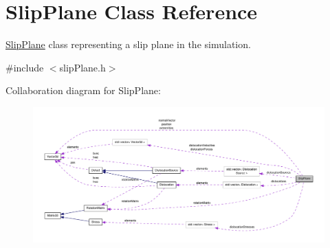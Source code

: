 \hypertarget{classSlipPlane}{\section{Slip\-Plane Class Reference}
\label{db/d25/classSlipPlane}
}


\hyperlink{classSlipPlane}{Slip\-Plane} class representing a slip plane in the simulation.  




{\ttfamily \#include $<$slip\-Plane.\-h$>$}



Collaboration diagram for Slip\-Plane\-:\nopagebreak
\begin{figure}[H]
\begin{center}
\leavevmode
\includegraphics[width=350pt]{d2/da3/classSlipPlane__coll__graph}
\end{center}
\end{figure}

